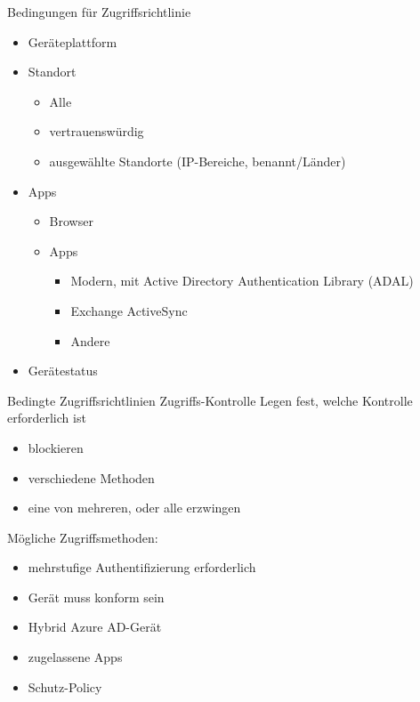 \begin{flashcard}[Definition]{Bedingungen für Zugriffsrichtlinie}
    \begin{itemize}
        \item Geräteplattform
        \item Standort
            \begin{itemize}
                \item Alle
                \item vertrauenswürdig
                \item ausgewählte Standorte (IP-Bereiche, benannt/Länder)
            \end{itemize}
        \item Apps
            \begin{itemize}
                \item Browser
                \item Apps
                    \begin{itemize}
                        \item Modern, mit Active Directory Authentication Library (ADAL)
                        \item Exchange ActiveSync
                        \item Andere
                    \end{itemize}
            \end{itemize}
        \item Gerätestatus
    \end{itemize}
\end{flashcard}

\begin{flashcard}[Definition]{Bedingte Zugriffsrichtlinien Zugriffs-Kontrolle}
    Legen fest, welche Kontrolle erforderlich ist
    \begin{itemize}
        \item blockieren
        \item verschiedene Methoden
        \item eine von mehreren, oder alle erzwingen
    \end{itemize}
    \vspace{1cm}
    Mögliche Zugriffsmethoden:
    \begin{itemize}
        \item mehrstufige Authentifizierung erforderlich
        \item Gerät muss konform sein
        \item Hybrid Azure AD-Gerät
        \item zugelassene Apps
        \item Schutz-Policy
    \end{itemize}

\end{flashcard}

